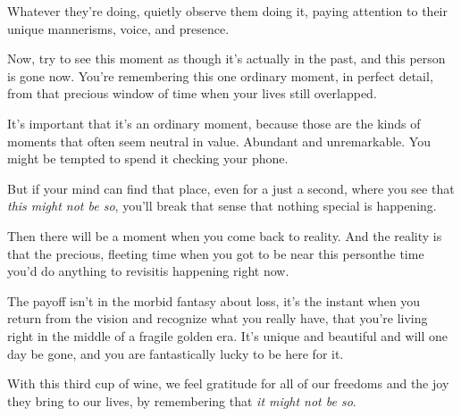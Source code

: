 {  \newReading Whatever they're doing, quietly observe them doing it, paying
  attention to their unique mannerisms, voice, and presence.

  Now, try to see this moment as though it's actually in the past, and this
  person is gone now. You're remembering this one ordinary moment, in perfect
  detail, from that precious window of time when your lives still overlapped.

  It's important that it's an ordinary moment, because those are the kinds of
  moments that often seem neutral in value. Abundant and unremarkable. You might
  be tempted to spend it checking your phone.

  But if your mind can find that place, even for a just a second, where you see
  that \textit{this might not be so}, you'll break that sense that nothing
  special is happening.

  \newReading Then there will be a moment when you come back to reality. And the
  reality is that the precious, fleeting time when you got to be near this
  person\textemdash{}the time you'd do anything to revisit\textemdash{}is
  happening right now.

  The payoff isn't in the morbid fantasy about loss, it's the instant when you
  return from the vision and recognize what you really have, that you're living
  right in the middle of a fragile golden era. It's unique and beautiful and
  will one day be gone, and you are fantastically lucky to be here for it.

  With this third cup of wine, we feel gratitude for all of our freedoms and the
  joy they bring to our lives, by remembering that \textit{it might not be so}.
}

